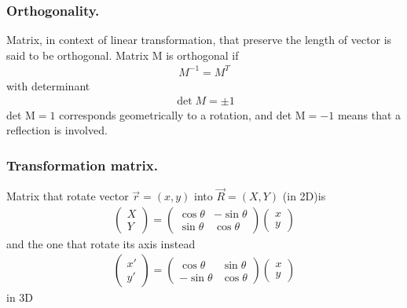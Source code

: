 \documentclass[../main.tex]{subfiles}
\begin{document}
\subsubsection*{Orthogonality.} Matrix, in context of linear transformation, that preserve the length of vector is said to be orthogonal.
Matrix M is orthogonal if
\begin{align*}
    M^{-1}=M^T
\end{align*} 
with determinant
\begin{align*}
    \det M = \pm 1
\end{align*}
det $\text{M} = 1$ corresponds geometrically to a rotation, and det $\text{M} = -1$ means that a reflection is involved.

\subsubsection*{Transformation matrix.} Matrix that rotate vector $\vec{r}=(x,y)$ into $\vec{R}=(X,Y)$ (in 2D)is
\begin{align*}
    \begin{pmatrix}
        X\\Y
    \end{pmatrix}=
    \begin{pmatrix}
        \cos \theta&-\sin \theta\\
        \sin \theta& \cos \theta
    \end{pmatrix}
    \begin{pmatrix}
        x\\y
    \end{pmatrix}
\end{align*}
and the one that rotate its axis instead
\begin{align*}
    \begin{pmatrix}
        x'\\y'
    \end{pmatrix}=
    \begin{pmatrix}
        \cos \theta&\sin \theta\\
        -\sin \theta& \cos \theta
    \end{pmatrix}
    \begin{pmatrix}
        x\\y
    \end{pmatrix}
\end{align*}
in 3D 
\end{document}

